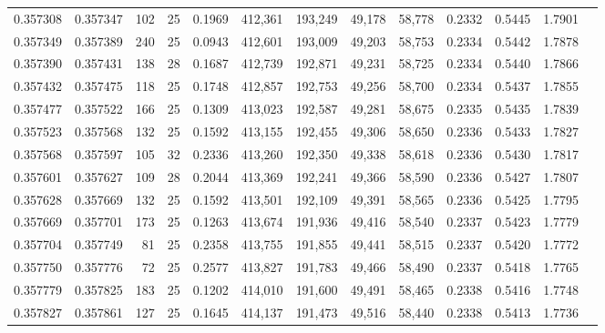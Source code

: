 \begin{tabular}{rrrrrrrrrrrrr}
0.357308 & 0.357347 &   102 &  25 &                                     0.1969 & 412,361 & 193,249 &  49,178 &  58,778 & 0.2332 & 0.5445 & 1.7901 \\
0.357349 & 0.357389 &   240 &  25 &                                     0.0943 & 412,601 & 193,009 &  49,203 &  58,753 & 0.2334 & 0.5442 & 1.7878 \\
0.357390 & 0.357431 &   138 &  28 &                                     0.1687 & 412,739 & 192,871 &  49,231 &  58,725 & 0.2334 & 0.5440 & 1.7866 \\
0.357432 & 0.357475 &   118 &  25 &                                     0.1748 & 412,857 & 192,753 &  49,256 &  58,700 & 0.2334 & 0.5437 & 1.7855 \\
0.357477 & 0.357522 &   166 &  25 &                                     0.1309 & 413,023 & 192,587 &  49,281 &  58,675 & 0.2335 & 0.5435 & 1.7839 \\
0.357523 & 0.357568 &   132 &  25 &                                     0.1592 & 413,155 & 192,455 &  49,306 &  58,650 & 0.2336 & 0.5433 & 1.7827 \\
0.357568 & 0.357597 &   105 &  32 &                                     0.2336 & 413,260 & 192,350 &  49,338 &  58,618 & 0.2336 & 0.5430 & 1.7817 \\
0.357601 & 0.357627 &   109 &  28 &                                     0.2044 & 413,369 & 192,241 &  49,366 &  58,590 & 0.2336 & 0.5427 & 1.7807 \\
0.357628 & 0.357669 &   132 &  25 &                                     0.1592 & 413,501 & 192,109 &  49,391 &  58,565 & 0.2336 & 0.5425 & 1.7795 \\
0.357669 & 0.357701 &   173 &  25 &                                     0.1263 & 413,674 & 191,936 &  49,416 &  58,540 & 0.2337 & 0.5423 & 1.7779 \\
0.357704 & 0.357749 &    81 &  25 &                                     0.2358 & 413,755 & 191,855 &  49,441 &  58,515 & 0.2337 & 0.5420 & 1.7772 \\
0.357750 & 0.357776 &    72 &  25 &                                     0.2577 & 413,827 & 191,783 &  49,466 &  58,490 & 0.2337 & 0.5418 & 1.7765 \\
0.357779 & 0.357825 &   183 &  25 &                                     0.1202 & 414,010 & 191,600 &  49,491 &  58,465 & 0.2338 & 0.5416 & 1.7748 \\
0.357827 & 0.357861 &   127 &  25 &                                     0.1645 & 414,137 & 191,473 &  49,516 &  58,440 & 0.2338 & 0.5413 & 1.7736 \\

\end{tabular}
